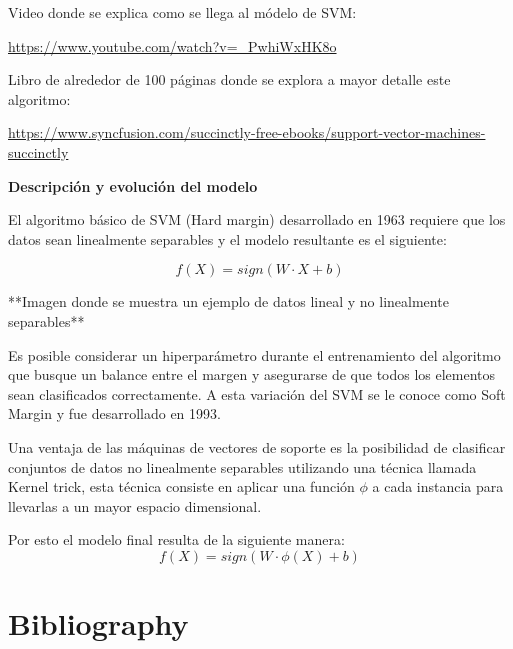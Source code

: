 \documentclass[11pt,fleqn]{book} %
\begin{document}
Video donde se explica como se llega al módelo de SVM:

\url{https://www.youtube.com/watch?v=_PwhiWxHK8o}

Libro de alrededor de 100 páginas donde se explora a mayor detalle este algoritmo:

\url{https://www.syncfusion.com/succinctly-free-ebooks/support-vector-machines-succinctly}

\textbf{Descripción y evolución del modelo}

El algoritmo básico de SVM (Hard margin) desarrollado en 1963 requiere que los datos sean linealmente separables y el modelo resultante es el siguiente:

\begin{equation}
\label{eqn:svm_basic}
f(X) = sign(W \cdot  X + b)
\end{equation}

**Imagen donde se muestra un ejemplo de datos lineal y no linealmente separables**

Es posible considerar un hiperparámetro durante el entrenamiento del algoritmo que busque un balance entre el margen y asegurarse de que todos los elementos sean clasificados correctamente. A esta variación del SVM se le conoce como Soft Margin y fue desarrollado en 1993.

Una ventaja de las máquinas de vectores de soporte es la posibilidad de clasificar conjuntos de datos no linealmente separables utilizando una técnica llamada Kernel trick, esta técnica consiste en aplicar una función $\phi$ a cada instancia para llevarlas a un mayor espacio dimensional.

Por esto el modelo final resulta de la siguiente manera:
\begin{equation}
\label{eqn:svm_basic}
f(X) = sign(W \cdot  \phi(X) + b)
\end{equation}


\chapter*{Bibliography}

\end{document}
